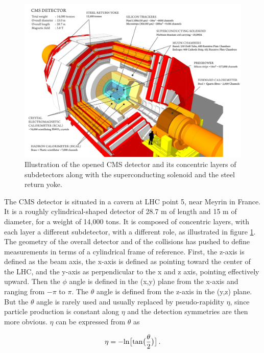 \begin{figure}
    \centering
    \includegraphics[width=\textwidth]{Images/CMS_subdetectors.png}
    \caption{Illustration of the opened CMS detector and its concentric layers of subdetectors along with the superconducting solenoid and the steel return yoke.}
    \label{fig:CMS_subdetectors}
\end{figure}

The CMS detector is situated in a cavern at LHC point 5, near Meyrin in France. It is a roughly cylindrical-shaped detector of 28.7 m of length and 15 m of diameter, for a weight of 14,000 tons. It is composed of concentric layers, with each layer a different subdetector, with a different role, as illustrated in figure \ref{fig:CMS_subdetectors}. The geometry of the overall detector and of the collisions has pushed to define measurements in terms of a cylindrical frame of reference. First, the z-axis is defined as the beam axis, the x-axis is defined as pointing toward the center of the LHC, and the y-axis as perpendicular to the x and z axis, pointing effectively upward. Then the $\phi$ angle is defined in the (x,y) plane from the x-axis and ranging from $-\pi$ to $\pi$. The $\theta$ angle is defined from the z-axis in the (y,z) plane. But the $\theta$ angle is rarely used and usually replaced by pseudo-rapidity $\eta$, since particle production is constant along $\eta$ and the detection symmetries are then more obvious. $\eta$ can be expressed from $\theta$ as

\begin{equation}
    \eta = - \mathrm{ln} \big[ \mathrm{tan} \big(\frac{\theta}{2}\big)\big] \mend
\end{equation}

